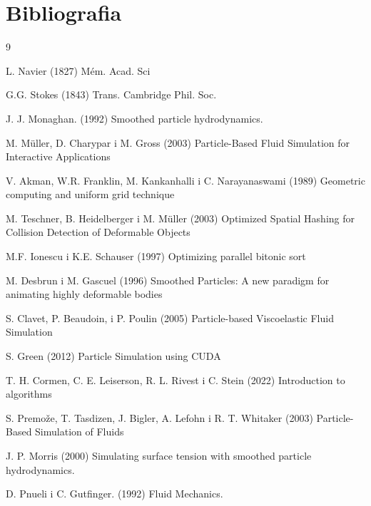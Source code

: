 \documentclass{article}
\begin{document}
\section{Bibliografia}
\begingroup
\renewcommand{\section}[2]{}
\begin{thebibliography}{9}

L. Navier (1827) Mém. Acad. Sci

G.G. Stokes (1843) Trans. Cambridge Phil. Soc.

J. J. Monaghan. (1992) Smoothed particle hydrodynamics.

M. Müller, D. Charypar i M. Gross (2003) Particle-Based Fluid Simulation for Interactive Applications

V. Akman, W.R. Franklin, M. Kankanhalli i C. Narayanaswami (1989) Geometric computing and uniform grid technique

M. Teschner, B. Heidelberger i M. Müller (2003) Optimized Spatial Hashing for Collision Detection of Deformable Objects

M.F. Ionescu i K.E. Schauser (1997) Optimizing parallel bitonic sort

M. Desbrun i M. Gascuel (1996) Smoothed Particles: A new paradigm for
animating highly deformable bodies

S. Clavet, P. Beaudoin, i P. Poulin (2005) Particle-based Viscoelastic Fluid Simulation

S. Green (2012) Particle Simulation using CUDA

T. H. Cormen, C. E. Leiserson, R. L. Rivest i C. Stein (2022) Introduction to algorithms

S. Premože, T. Tasdizen, J. Bigler, A. Lefohn i R. T. Whitaker (2003) Particle-Based Simulation of Fluids

J. P. Morris (2000) Simulating surface tension with smoothed particle
hydrodynamics.

D. Pnueli i C. Gutfinger. (1992) Fluid Mechanics.
\end{thebibliography}
\endgroup
\end{document}
